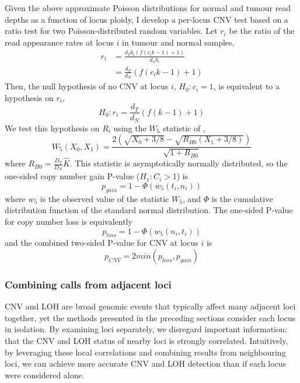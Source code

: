 \documentclass[thesis.tex]{subfiles}
\begin{document}
Given the above approximate Poisson distributions for normal and tumour read depths as a function of locus ploidy, I develop a per-locus \gls{CNV} test based on a ratio test for two Poisson-distributed random variables.  Let $r_i$ be the ratio of the read appearance rates at locus $i$ in tumour and normal samples, 
\begin{align}
  r_i &= \frac{d_T b_i \left( f \left( c_i k - 1 \right) + 1\right)}{d_n b_i} \\
      &= \frac{d_T}{d_N} \left( f \left( c_i k - 1 \right) + 1\right)
\end{align}
Then, the null hypothesis of no \gls{CNV} at locus $i$, $H_0: c_i = 1$, is equivalent to a hypothesis on $r_i$, 
\begin{equation}
H_0: r_i = \frac{d_T}{d_N} \left( f \left(k - 1\right) + 1 \right)
\end{equation}
We test this hypothesis on $R_i$ using the $W_5$ statistic of \cite{Gu2008},
\begin{equation}
  W_5(X_0, X_1) = \frac{2\left(\sqrt{X_0 + 3/8} - \sqrt{R_{H0}\left(X_1 + 3/8\right)}\right)}{\sqrt{1 + R_{H0}}}
\end{equation}
where $R_{H0} = \frac{D_T}{D_N}\hat{K}$.  This statistic is asymptotically normally distributed, so the one-sided copy number gain P-value ($H_1: C_i > 1$) is
\begin{equation}
  p_{gain} = 1 - \Phi\left(w_5(t_i, n_i)\right)
\end{equation}
where $w_5$ is the observed value of the statistic $W_5$, and $\Phi$ is the cumulative distribution function of the standard normal distribution.  The one-sided P-value for copy number loss is equivalently
\begin{equation}
  p_{loss} = 1 - \Phi\left(w_5(n_i, t_i)\right)
\end{equation}
and the combined two-sided P-value for \gls{CNV} at locus $i$ is
\begin{equation}
  p_{CNV} = 2 min(p_{loss}, p_{gain})
\end{equation}



\subsubsection{Combining calls from adjacent loci}

\Gls{CNV} and \gls{LOH} are broad genomic events that typically affect many adjacent loci together, yet the methods presented in the preceding sections consider each locus in isolation.  By examining loci separately, we disregard important information: that the \gls{CNV} and \gls{LOH} status of nearby loci is strongly correlated.  Intuitively, by leveraging these local correlations and combining results from neighbouring loci, we can achieve more accurate \gls{CNV} and \gls{LOH} detection than if each locus were considered alone.
\end{document}
